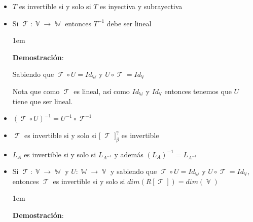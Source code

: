 \documentclass[12pt, fleqn]{report}                             %
\newenvironment{SmallIndentation}[1][0.75em]                    %
        {\begin{adjustwidth}{#1}{}\begin{footnotesize}}             %
        {\end{footnotesize}\end{adjustwidth}}                       %
\theoremstyle{break}                                            %
\DeclareMathOperator \VectorSet    {\mathbb{V}}                 %
\DeclareMathOperator \SubVectorSet {\mathbb{W}}                 %
\DeclareMathOperator \LinTrans      {\mathcal{T}}               %
\newcommand{\bigBrackets}[1]    {\big[ \; #1 \; \big]}          %
\begin{document}
                \begin{itemize}

                    \item
                        $T$ es invertible si y solo si $T$ es inyectiva y subrayectiva

                    \item
                        Si $\LinTrans: \VectorSet \to \SubVectorSet$ entonces $T^{-1}$ debe ser lineal

                        \begin{SmallIndentation}[1em]
                            \textbf{Demostración}:

                            Sabiendo que $\LinTrans \circ U = Id_{\SubVectorSet}$ y 
                            $U \circ \LinTrans = Id_{\VectorSet}$
                            
                            Nota que como $\LinTrans$ es lineal, así como $Id_{\SubVectorSet}$ y
                            $Id_{\VectorSet}$ entonces tenemos que $U$ tiene que ser lineal.
                        
                        \end{SmallIndentation}
                            

                    \item 
                        $(\LinTrans \circ U)^{-1} = U^{-1} \circ \LinTrans^{-1}$

                    \item
                        $\LinTrans$ es invertible si y solo si $\bigBrackets{\LinTrans}_\beta^\gamma$ es invertible

                    \item
                        $L_A$ es invertible si y solo si $L_{A^{-1}}$ 
                            y además $(L_{A})^{-1} = L_{A^{-1}}$

                    \item
                        Si $\LinTrans: \VectorSet \to \SubVectorSet$ y $U: \SubVectorSet \to \VectorSet$
                        y sabiendo que $\LinTrans \circ U = Id_{\SubVectorSet}$ y 
                        $U \circ \LinTrans = Id_{\VectorSet}$, entonces
                        $\LinTrans$ es invertible si y solo si $dim(R[\LinTrans]) = dim(\VectorSet)$

                        \begin{SmallIndentation}[1em]
                            \textbf{Demostración}:
                            

\end{SmallIndentation}
\end{itemize}
\end{document}

